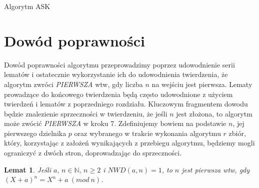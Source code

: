\documentclass[declaration,shortabstract]{iithesis}
\theoremstyle{definition}
\theoremstyle{remark} \newtheorem{observation}{Obserwacja}
\theoremstyle{plain} \newtheorem{theorem}{Twierdzenie}
\theoremstyle{plain} \newtheorem{lemma}{Lemat}
\theoremstyle{remark} \newtheorem*{remark*}{Uwaga}
\theoremstyle{reminder} \newtheorem*{reminder*}{Przypomnienie}
\begin{document}
\begin{algorithm}
	\caption{Algorytm ASK}
	\begin{algorithmic}[1]
									    
		 
		\EndIf
		 
		 
		\EndIf
		   \EndIf
		 
		 
		\EndIf
		\EndFor
		 
	\end{algorithmic}
\end{algorithm}
	
\section{Dowód poprawności}
    
Dowód poprawności algorytmu przeprowadzimy poprzez udowodnienie serii lematów i ostatecznie wykorzystanie ich do udowodnienia twierdzenia, że algorytm zwróci \textit{PIERWSZA} wtw, gdy liczba $n$ na wejściu jest pierwsza. Lematy prowadzące do końcowego twierdzenia będą często udowodnione z użyciem twierdzeń i lematów z poprzedniego rozdziału. Kluczowym fragmentem dowodu będzie znalezienie sprzeczności w twierdzeniu, że jeśli $n$ jest złożona, to algorytm może zwócić \textit{PIERWSZA} w kroku 7. Zdefiniujemy bowiem na podstawie $n$, jej pierwszego dzielnika $p$ oraz wybranego w trakcie wykonania algorytmu $r$ zbiór, który, korzystając z założeń wynikających z przebiegu algorytmu, będziemy mogli ograniczyć z dwóch stron, doprowadzając do sprzeczności. 
\begin{lemma}\label{L1}
	Jeśli $a, \, n \in \mathbb{N}, \, n \geq 2$ i $NWD(a, n) = 1$, to $n$ jest pierwsza wtw, gdy $(X + a)^n = X^n + a \: (mod \: n)$.
\end{lemma}
	
\end{document}
